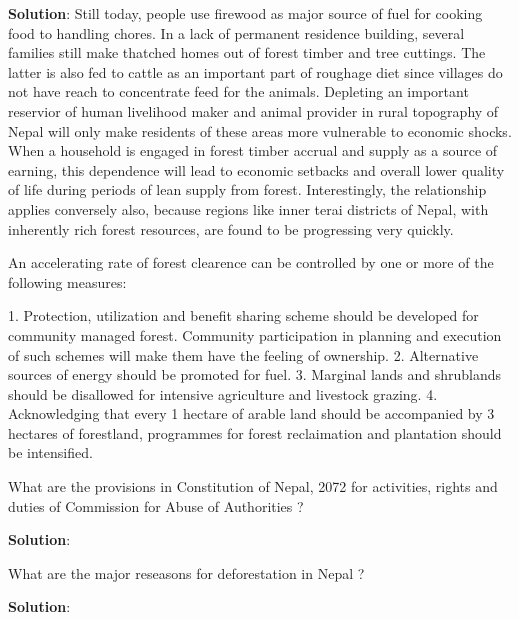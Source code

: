 \documentclass[
]{book}
\newcommand{\question}{\item}
\newenvironment{solution}{ {\bfseries Solution}:}{}
\begin{document}
\begin{questions}
\begin{solution}
Still today, people use firewood as major source of fuel for cooking food to handling chores. In a lack of permanent residence building, several families still make thatched homes out of forest timber and tree cuttings. The latter is also fed to cattle as an important part of roughage diet since villages do not have reach to concentrate feed for the animals. Depleting an important reservior of human livelihood maker and animal provider in rural topography of Nepal will only make residents of these areas more vulnerable to economic shocks. When a household is engaged in forest timber accrual and supply as a source of earning, this dependence will lead to economic setbacks and overall lower quality of life during periods of lean supply from forest. Interestingly, the relationship applies conversely also, because regions like inner terai districts of Nepal, with inherently rich forest resources, are found to be progressing very quickly.

An accelerating rate of forest clearence can be controlled by one or more of the following measures:

1. Protection, utilization and benefit sharing scheme should be developed for community managed forest. Community participation in planning and execution of such schemes will make them have the feeling of ownership.
2. Alternative sources of energy should be promoted for fuel.
3. Marginal lands and shrublands should be disallowed for intensive agriculture and livestock grazing.
4. Acknowledging that every 1 hectare of arable land should be accompanied by 3 hectares of forestland, programmes for forest reclaimation and plantation should be intensified.

\end{solution}

\question What are the provisions in Constitution of Nepal, 2072 for activities, rights and duties of Commission for Abuse of Authorities ?

\begin{solution}

\end{solution}

\question What are the major reseasons for deforestation in Nepal ?

\begin{solution}


\end{solution}
\end{questions}
\end{document}
